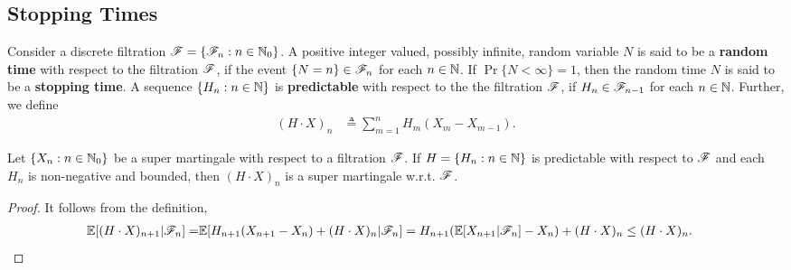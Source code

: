 \documentclass[a4paper,10pt,english]{article}
\begin{document}
\subsection{Stopping Times}
Consider a discrete filtration $\mathscr{F} = \{\mathscr{F}_n: n \in \mathbb{N}_0\}$.  
A positive integer valued, possibly infinite, random variable $N$ is said to be a \textbf{random time} with respect to the 
filtration $\mathscr{F}$,  if the event $\{N=n\} \in \mathscr{F}_n$ for each $n \in \mathbb{N}$. 
If $\Pr\{N < \infty\}=1$, then the random time $N$ is said to be a \textbf{stopping time}. 
A sequence $\{H_n: n\in \mathbb{N}\}$ is \textbf{predictable} with respect to the the filtration $\mathscr{F}$, if $H_n \in \mathscr{F}_{n-1}$ for each $n \in \mathbb{N}$. 
Further, we define 
\begin{align*}
(H\cdot X)_n &\triangleq \sum_{m=1}^{n}H_m(X_m-X_{m-1}).
\end{align*}
\begin{thm}
Let $\{X_n: n \in \mathbb{N}_0\}$ be a super martingale with respect to a filtration $\mathscr{F}$. 
If $H = \{H_n: n \in \mathbb{N}\}$ is predictable with respect to $\mathscr{F}$ and each $H_n$ is non-negative and bounded, 
then $(H \cdot X)_n$ is a super martingale w.r.t. $\mathscr{F}$. 
\end{thm}
\begin{proof}
It follows from the definition, 
\begin{align*}
\mathbb{E}[(H\cdot X)_{n+1}|\mathscr{F}_n]=&\mathbb{E}[H_{n+1}(X_{n+1}-X_n)+(H\cdot X)_n|\mathscr{F}_n] = H_{n+1}(\mathbb{E}[X_{n+1}|\mathscr{F}_n]-X_n)+(H\cdot X)_n \leq (H\cdot X)_n.
\end{align*}
\end{proof}
\end{document}
